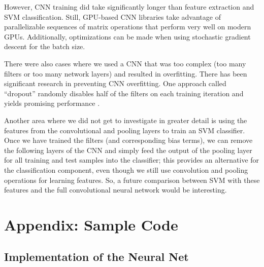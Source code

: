 \documentclass[10pt,twocolumn]{article}
\begin{document}
However, CNN training did take significantly longer than feature extraction and SVM classification. Still, GPU-based CNN libraries take advantage of parallelizable sequences of matrix operations that perform very well on modern GPUs. Additionally, optimizations can be made when using stochastic gradient descent for the batch size.

There were also cases where we used a CNN that was too complex (too many filters or too many network layers) and resulted in overfitting. There has been significant research in preventing CNN overfitting. One approach called ``dropout'' randomly disables half of the filters on each training iteration and yields promising performance \cite{dropout}.

Another area where we did not get to investigate in greater detail is using the features from the convolutional and pooling layers to train an SVM classifier. Once we have trained the filters (and corresponding bias terms), we can remove the following layers of the CNN and simply feed the output of the pooling layer for all training and test samples into the classifier; this provides an alternative for the classification component, even though we still use convolution and pooling operations for learning features. So, a future comparison between SVM with these features and the full convolutional neural network would be interesting.

\section{Appendix: Sample Code}

\subsection{Implementation of the Neural Net}

{}

\end{document}
